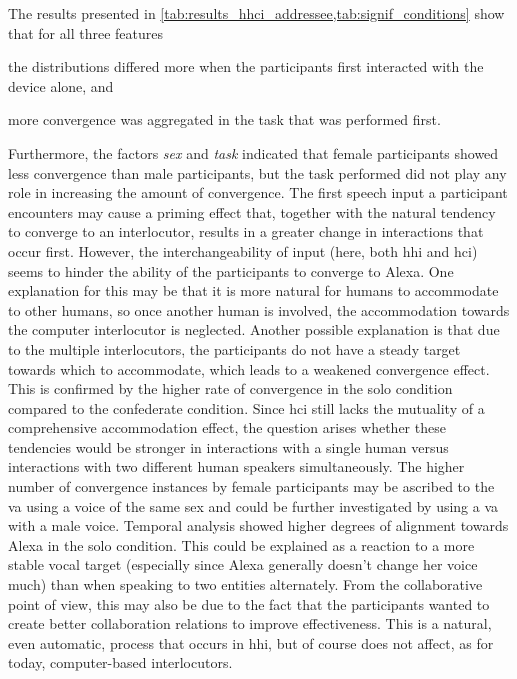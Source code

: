 The results presented in \cref{tab:results_hhci_addressee,tab:signif_conditions} show that for all three features
\begin{enumerate*}[(a)]
	\item the distributions differed more when the participants first interacted with the device alone, and
	\item more convergence was aggregated in the task that was performed first.
\end{enumerate*}
Furthermore, the factors \emph{sex} and \emph{task} indicated that female participants showed less convergence than male participants, but the task performed did not play any role in increasing the amount of convergence.
The first speech input a participant encounters may cause a priming effect that, together with the natural tendency to converge to an interlocutor, results in a greater change in interactions that occur first.
However, the interchangeability of input (here, both \ac{hhi} and \ac{hci}) seems to hinder the ability of the participants to converge to Alexa.
One explanation for this may be that it is more natural for humans to accommodate to other humans, so once another human is involved, the accommodation towards the computer interlocutor is neglected.
Another possible explanation is that due to the multiple interlocutors, the participants do not have a steady target towards which to accommodate, which leads to a weakened convergence effect.
This is confirmed by the higher rate of convergence in the solo condition compared to the confederate condition.
Since \ac{hci} still lacks the mutuality of a comprehensive accommodation effect, the question arises whether these tendencies would be stronger in interactions with a single human versus interactions with two different human speakers simultaneously.
The higher number of convergence instances by female participants may be ascribed to the \ac{va} using a voice of the same sex and could be further investigated by using a \ac{va} with a male voice.
Temporal analysis showed higher degrees of alignment towards Alexa in the solo condition.
This could be explained as a reaction to a more stable vocal target (especially since Alexa generally doesn't change her voice much) than when speaking to two entities alternately.
From the collaborative point of view, this may also be due to the fact that the participants wanted to create better collaboration relations to improve effectiveness.
This is a natural, even automatic, process that occurs in \ac{hhi}, but of course does not affect, as for today, computer-based interlocutors.
